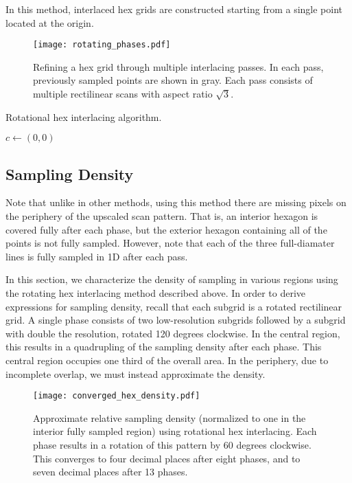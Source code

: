 \documentclass{article}
\begin{document}
In this method, interlaced hex grids are constructed starting from a single point
located at the origin.

\begin{figure}[ht]
\centering
\texttt{[image: rotating\_phases.pdf]}
\caption{
\label{fig:rotatingphases} Refining a hex grid through multiple interlacing passes.
%
In each pass, previously sampled points are shown in gray.
%
Each pass consists of multiple rectilinear scans with aspect ratio $\sqrt{3}$.
}
\end{figure}

\begin{algorithm}
\caption{Rotational hex interlacing algorithm.}\label{alg:rotating}
\begin{algorithmic}
	\State $c \gets (0, 0)$
\end{algorithmic}
\end{algorithm}

\subsection{Sampling Density}
\label{sec:density}

Note that unlike in other methods, using this method there are missing pixels on the periphery of the upscaled scan pattern.
%
That is, an interior hexagon is covered fully after each phase, but the exterior hexagon containing all of the points is not fully sampled.
%
However, note that each of the three full-diamater lines is fully sampled in 1D after each pass.


In this section, we characterize the density of sampling in various regions using the rotating hex interlacing method described above.
%
In order to derive expressions for sampling density, recall that each subgrid is a rotated rectilinear grid.
%
A single phase consists of two low-resolution subgrids followed by a subgrid with double the resolution, rotated 120 degrees clockwise.
%
In the central region, this results in a quadrupling of the sampling density after each phase.
%
This central region occupies one third of the overall area.
%
In the periphery, due to incomplete overlap, we must instead approximate the density.


\begin{figure}[ht]
\centering
\texttt{[image: converged\_hex\_density.pdf]}
\caption{
\label{fig:hexdensity}
Approximate relative sampling density (normalized to one in the interior fully sampled region) using rotational hex interlacing.
%
Each phase results in a rotation of this pattern by 60 degrees clockwise.
%
This converges to four decimal places after eight phases, and to seven decimal places after 13 phases.
}
\end{figure}
\end{document}

